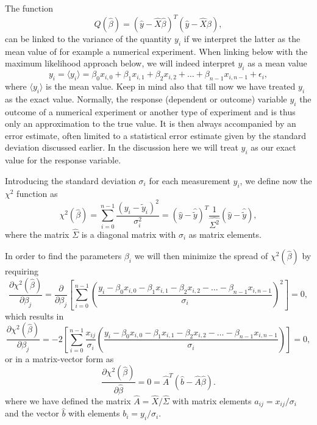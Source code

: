 \documentclass[%
oneside,                 %
final,                   %
10pt]{article}
\begin{document}
The function 
\[
Q(\hat{\beta})=\left(\hat{y}-\hat{X}\hat{\beta}\right)^T\left(\hat{y}-\hat{X}\hat{\beta}\right),
\]
can be linked to the variance of the quantity $y_i$ if we interpret the latter as the mean value of for example a numerical  experiment. When linking below with the maximum likelihood approach below, we will indeed interpret $y_i$ as a mean value
\[
y_{i}=\langle y_i \rangle = \beta_0x_{i,0}+\beta_1x_{i,1}+\beta_2x_{i,2}+\dots+\beta_{n-1}x_{i,n-1}+\epsilon_i,
\]
where $\langle y_i \rangle$ is the mean value. Keep in mind also that till now  we have treated $y_i$ as the exact value. Normally, the response (dependent or outcome) variable $y_i$ the outcome of a numerical experiment or another type of experiment and is thus only an approximation to the true value. It is then always accompanied by an error estimate, often limited to a statistical error estimate given by the standard deviation discussed earlier. In the discussion here we will treat $y_i$ as our exact value for the response variable.

Introducing the standard deviation $\sigma_i$ for each measurement $y_i$, we define now the $\chi^2$ function as  
\[
\chi^2(\hat{\beta})=\sum_{i=0}^{n-1}\frac{\left(y_i-\tilde{y}_i\right)^2}{\sigma_i^2}=\left(\hat{y}-\hat{\tilde{y}}\right)^T\frac{1}{\hat{\Sigma^2}}\left(\hat{y}-\hat{\tilde{y}}\right),
\]
where the matrix $\hat{\Sigma}$ is a diagonal matrix with $\sigma_i$ as matrix elements. 




In order to find the parameters $\beta_i$ we will then minimize the spread of $\chi^2(\hat{\beta})$ by requiring
\[
\frac{\partial \chi^2(\hat{\beta})}{\partial \beta_j} = \frac{\partial }{\partial \beta_j}\left[ \sum_{i=0}^{n-1}\left(\frac{y_i-\beta_0x_{i,0}-\beta_1x_{i,1}-\beta_2x_{i,2}-\dots-\beta_{n-1}x_{i,n-1}}{\sigma_i}\right)^2\right]=0, 
\]
which results in
\[
\frac{\partial \chi^2(\hat{\beta})}{\partial \beta_j} = -2\left[ \sum_{i=0}^{n-1}\frac{x_{ij}}{\sigma_i}\left(\frac{y_i-\beta_0x_{i,0}-\beta_1x_{i,1}-\beta_2x_{i,2}-\dots-\beta_{n-1}x_{i,n-1}}{\sigma_i}\right)\right]=0, 
\]
or in a matrix-vector form as
\[
\frac{\partial \chi^2(\hat{\beta})}{\partial \hat{\beta}} = 0 = \hat{A}^T\left( \hat{b}-\hat{A}\hat{\beta}\right).  
\]
where we have defined the matrix $\hat{A} =\hat{X}/\hat{\Sigma}$ with matrix elements $a_{ij} = x_{ij}/\sigma_i$ and the vector $\hat{b}$ with elements $b_i = y_i/\sigma_i$.   
\end{document}
